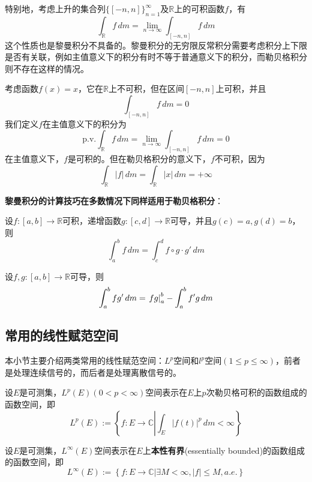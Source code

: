 特别地，考虑上升的集合列$\{[-n,n]\}_{n=1}^{\infty}$及$\mathbb{R}$上的可积函数$f$，有
\[\int_{\mathbb{R}}f\,dm=\lim_{n\to\infty}\int_{[-n,n]}f\,dm\]
这个性质也是黎曼积分不具备的。黎曼积分的无穷限反常积分需要考虑积分上下限是否有关联，例如主值意义下的积分有时不等于普通意义下的积分，而勒贝格积分则不存在这样的情况。

\begin{example}
    考虑函数$f(x)=x$，它在$\mathbb{R}$上不可积，但在区间$[-n,n]$上可积，并且\[\int_{[-n,n]}f\,dm=0\]
    我们定义$f$在主值意义下的积分为
    \[\text{p.v.}\int_{\mathbb{R}}f\,dm=\lim_{n\to\infty}\int_{[-n,n]}f\,dm=0\]
    在主值意义下，$f$是可积的。但在勒贝格积分的意义下，$f$不可积，因为
    \[\int_{\mathbb{R}}|f|\,dm=\int_{\mathbb{R}}|x|\,dm=+\infty\]
\end{example}

\textbf{黎曼积分的计算技巧在多数情况下同样适用于勒贝格积分}：
\begin{theorem}[勒贝格积分的变量代换]
    设$f:[a,b]\to\mathbb{R}$可积，递增函数$g:[c,d]\to \mathbb{R}$可导，并且$g(c)=a,g(d)=b$，则
    \[\int_{a}^{b}f\,dm=\int_{c}^{d}f\circ g\cdot g'\,dm\]
\end{theorem}

\begin{theorem}[勒贝格积分的分部积分法]
    设$f,g:[a,b]\to\mathbb{R}$可导，则
    \[\int_{a}^{b}f g'\,dm=\left.fg\right|_{a}^{b}-\int_{a}^{b}f' g\,dm\]
\end{theorem}

\subsection{常用的线性赋范空间}\label{sub:Lp_space}

本小节主要介绍两类常用的线性赋范空间：$L^p$空间和$l^p$空间$(1\leq p\leq \infty)$，前者是处理连续信号的，而后者是处理离散信号的。

\begin{definition}[$L^p$空间]
    设$E$是可测集，$L^p(E)(0<p<\infty)$空间表示在$E$上$p$次勒贝格可积的函数组成的函数空间，即
    \[L^p(E):=\left\{f:E\rightarrow \mathbb{C} \left| \int_{E}|f(t)|^p\,dm<\infty\right.\right\}\]
\end{definition}

\begin{definition}[$L^{\infty}$空间]
    设$E$是可测集，$L^{\infty}(E)$空间表示在$E$上\textbf{本性有界}(essentially bounded)的函数组成的函数空间，即
    \[L^{\infty}(E):=\left\{f:E\rightarrow \mathbb{C} \left|\exists M<\infty,|f|\leq M,a.e.\right.\right\}\]
\end{definition}

